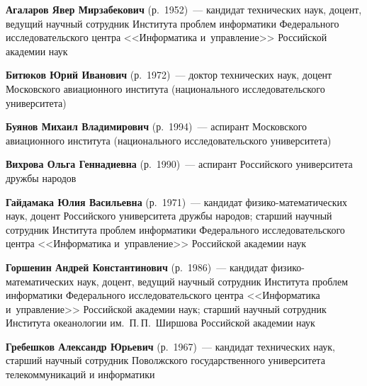 \begin{multicols}{2}

\noindent
\textbf{Агаларов Явер Мирзабекович} (р.\ 1952)~--- 
кандидат технических наук, доцент, ведущий научный сотрудник 
Института проб\-лем информатики Федерального исследовательского центра 
<<Информатика и~управ\-ле\-ние>> Российской академии наук

\vspace*{3pt}

\noindent
\textbf{Битюков Юрий Иванович} (р.\ 1972)~---
доктор технических наук, доцент Московского авиационного института 
(национального исследовательского университета) 

\vspace*{3pt}

\noindent
\textbf{Буянов Михаил Владимирович} (р.\ 1994)~--- 
аспирант Московского авиационного института (национального исследовательского 
университета)

\vspace*{3pt}

\noindent
\textbf{Вихрова Ольга Геннадиевна} (р.\ 1990)~---
 аспирант Российского университета дружбы народов
 
 \vspace*{3pt}
 

\noindent
\textbf{Гайдамака Юлия Васильевна} (р.\ 1971)~--- 
кандидат фи\-зи\-ко-ма\-те\-ма\-ти\-че\-ских наук, доцент Российского университета 
дружбы народов; старший научный сотрудник Института проб\-лем информатики 
Федерального исследовательского центра <<Информатика и~управ\-ле\-ние>> 
Российской академии наук 

\vspace*{3pt}

\noindent
\textbf{Горшенин Андрей Константинович} (р.\ 1986)~--- 
кандидат фи\-зи\-ко-ма\-те\-ма\-ти\-че\-ских наук, доцент, 
ведущий научный сотрудник Института проб\-лем информатики Федерального 
исследовательского\linebreak
 центра <<Информатика и~управ\-ле\-ние>> Российской академии наук;
 старший научный сотрудник
 Института океанологии им.\ П.\,П.~Ширшова Российской академии наук

\vspace*{3pt}


\noindent
\textbf{Гребешков Александр Юрьевич} (р.\ 1967)~--- 
кандидат технических наук, старший научный сотрудник Поволжского 
государственного университета телекоммуникаций и информатики

\vspace*{3pt}


\end{multicols}
